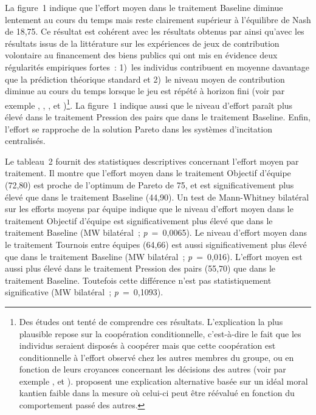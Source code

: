 \begin{Article}
\begin{refsection}[Lebourges]
La figure~1 indique que l'effort moyen dans le traitement Baseline
diminue lentement au cours du temps mais reste clairement supérieur à
l'équilibre de Nash de 18,75. Ce résultat est cohérent avec les
résultats obtenus par \textcite{NalbantianSchotter1997} ainsi qu'avec
les résultats issus de la littérature sur les expériences de jeux de
contribution volontaire au financement des biens publics qui ont mis en
évidence deux régularités empiriques fortes~: 1)~les individus
contribuent en moyenne davantage que la prédiction théorique standard et
2)~le niveau moyen de contribution diminue au cours du temps lorsque le
jeu est répété à horizon fini (voir par exemple \textcite{FehrGächter2000}, \textcite{MascletNoussairTuckerVilleval2003}, \textcite{Zelmer2003}, \textcite{SeftonShuppWalker2007} et \textcite{HerrmannThoniGächter2008})\footnote{Des études ont tenté de comprendre ces résultats.
  L'explication la plus plausible repose sur la coopération
  conditionnelle, c'est-à-dire le fait que les individus seraient
  disposés à coopérer mais que cette coopération est conditionnelle à
  l'effort observé chez les autres membres du groupe, ou en fonction de
  leurs croyances concernant les décisions des autres (voir par exemple
  \textcite{KeserVanWinder2000}, \textcite{FischbacherGächter2010} et
  \textcite{ThoniVolk2018}). \textcite{FiguièresMascletWillinger2013}
  proposent une explication alternative basée sur un idéal moral kantien
  faible dans la mesure où celui-ci peut être réévalué en fonction du
  comportement passé des autres.}. La figure~1 indique aussi que le
niveau d'effort paraît plus élevé dans le traitement Pression des pairs
que dans le traitement Baseline. Enfin, l'effort se rapproche de la
solution Pareto dans les systèmes d'incitation centralisés.

Le tableau~2 fournit des statistiques descriptives concernant l'effort
moyen par traitement. Il montre que l'effort moyen dans le traitement
Objectif d'équipe (72,80) est proche de l'optimum de Pareto de 75, et
est significativement plus élevé que dans le traitement Baseline
(44,90). Un test de Mann-Whitney bilatéral sur les efforts moyens par
équipe indique que le niveau d'effort moyen dans le traitement Objectif
d'équipe est significativement plus élevé que dans le traitement
Baseline (MW bilatéral~; \emph{p}~=~0,0065). Le niveau d'effort moyen
dans le traitement Tournois entre équipes (64,66) est aussi
significativement plus élevé que dans le traitement Baseline (MW
bilatéral~; \emph{p}~=~0,016). L'effort moyen est aussi plus élevé dans
le traitement Pression des pairs (55,70) que dans le traitement
Baseline. Toutefois cette différence n'est pas statistiquement
significative (MW bilatéral~; \emph{p}~=~0,1093).


\end{refsection}
\end{Article}

